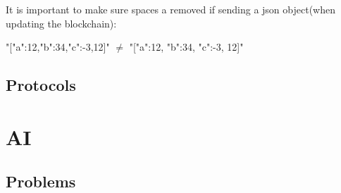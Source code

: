 \documentclass[11pt]{extarticle}
\begin{document}
It is important to make sure spaces a removed if sending a json object(when updating the blockchain):

\begin{center}
"[{"a":12,"b":34,"c":-3},12]" $\neq$ "[{"a":12, "b":34, "c":-3}, 12]"
\end{center}

\subsection{Protocols}

\section{AI}
\subsection{Problems}



\end{document}

